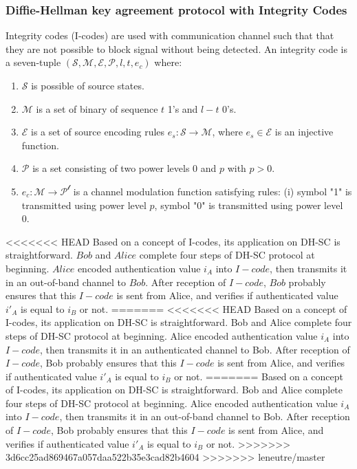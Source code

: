 \begin{enumerate}
\begin{enumerate}
\begin{center}
\begin{tikzpicture}[thick,scale=0.8, every node/.style={scale=0.8}]
\end{tikzpicture}
\end{center}

\subsubsection*{Diffie-Hellman key agreement protocol with Integrity Codes}

Integrity codes (I-codes) are used with communication channel such that that they are not possible to block signal without being detected. An integrity code is a seven-tuple $(\mathcal{S},\mathcal{M},\mathcal{E},\mathcal{P},l,t,e_c)$ where:
\begin{enumerate}
\item $\mathcal{S}$ is possible of source states. 
\item $\mathcal{M}$ is a set of binary of sequence $t$ 1's and $l-t$ 0's. 
\item $\mathcal{E}$ is a set of source encoding rules $e_s: \mathcal{S} \rightarrow \mathcal{M}$, where $e_s \in \mathcal{E}$ is an injective function. 
\item $\mathcal{P}$ is a set consisting of two power levels 0 and $p$ with $p > 0$.
\item $e_c:\mathcal{M} \rightarrow \mathcal{P^l}$ is a channel modulation function satisfying rules: (i) symbol "1" is transmitted using power level $p$, symbol "0" is transmitted using power level 0. 
\end{enumerate} 

<<<<<<< HEAD
Based on a concept of I-codes, its application on DH-SC is straightforward. $Bob$ and $Alice$ complete four steps of DH-SC protocol at beginning. $Alice$ encoded authentication value $i_A$ into $I-code$, then transmits it in an out-of-band channel to $Bob$. After reception of $I-code$, $Bob$ probably ensures that this $I-code$ is sent from Alice, and verifies if authenticated value $i'_A$ is equal to $i_B$ or not. 
=======
<<<<<<< HEAD
Based on a concept of I-codes, its application on DH-SC is straightforward. Bob and Alice complete four steps of DH-SC protocol at beginning. Alice encoded authentication value $i_A$ into $I-code$, then transmits it in an authenticated channel to Bob. After reception of $I-code$, Bob probably ensures that this $I-code$ is sent from Alice, and verifies if authenticated value $i'_A$ is equal to $i_B$ or not. 
=======
Based on a concept of I-codes, its application on DH-SC is straightforward. Bob and Alice complete four steps of DH-SC protocol at beginning. Alice encoded authentication value $i_A$ into $I-code$, then transmits it in an out-of-band channel to Bob. After reception of $I-code$, Bob probably ensures that this $I-code$ is sent from Alice, and verifies if authenticated value $i'_A$ is equal to $i_B$ or not. 
>>>>>>> 3d6cc25ad869467a057daa522b35e3cad82b4604
>>>>>>> leneutre/master
 

\end{enumerate}
\end{enumerate}
